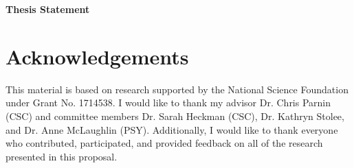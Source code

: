 \documentclass[runningheads]{llncs}
\begin{document}
\noindent
\textbf{\large Thesis Statement} \\












\section{Acknowledgements}

This material is based on research supported by the National Science Foundation under Grant No. 1714538. I would like to thank my advisor Dr. Chris Parnin (CSC) and committee members Dr. Sarah Heckman (CSC), Dr. Kathryn Stolee, and Dr. Anne McLaughlin (PSY). Additionally, I would like to thank everyone who contributed, participated, and provided feedback on all of the research presented in this proposal.



%
%
%
% 
% 
%


\end{document}
